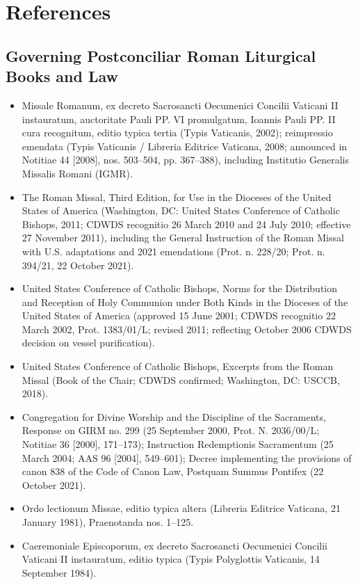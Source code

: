 \section*{References}
\subsection*{Governing Postconciliar Roman Liturgical Books and Law}
\begin{itemize}
\item Missale Romanum, ex decreto Sacrosancti Oecumenici Concilii Vaticani II instauratum, auctoritate Pauli PP. VI promulgatum, Ioannis Pauli PP. II cura recognitum, editio typica tertia (Typis Vaticanis, 2002); reimpressio emendata (Typis Vaticanis / Libreria Editrice Vaticana, 2008; announced in Notitiae 44 [2008], nos. 503--504, pp. 367--388), including Institutio Generalis Missalis Romani (IGMR).
\item The Roman Missal, Third Edition, for Use in the Dioceses of the United States of America (Washington, DC: United States Conference of Catholic Bishops, 2011; CDWDS recognitio 26 March 2010 and 24 July 2010; effective 27 November 2011), including the General Instruction of the Roman Missal with U.S. adaptations and 2021 emendations (Prot. n. 228/20; Prot. n. 394/21, 22 October 2021).
\item United States Conference of Catholic Bishops, Norms for the Distribution and Reception of Holy Communion under Both Kinds in the Dioceses of the United States of America (approved 15 June 2001; CDWDS recognitio 22 March 2002, Prot. 1383/01/L; revised 2011; reflecting October 2006 CDWDS decision on vessel purification).
\item United States Conference of Catholic Bishops, Excerpts from the Roman Missal (Book of the Chair; CDWDS confirmed; Washington, DC: USCCB, 2018).
\item Congregation for Divine Worship and the Discipline of the Sacraments, Response on GIRM no. 299 (25 September 2000, Prot. N. 2036/00/L; Notitiae 36 [2000], 171--173); Instruction Redemptionis Sacramentum (25 March 2004; AAS 96 [2004], 549--601); Decree implementing the provisions of canon 838 of the Code of Canon Law, Postquam Summus Pontifex (22 October 2021).
\item Ordo lectionum Missae, editio typica altera (Libreria Editrice Vaticana, 21 January 1981), Praenotanda nos. 1--125.
\item Caeremoniale Episcoporum, ex decreto Sacrosancti Oecumenici Concilii Vaticani II instauratum, editio typica (Typis Polyglottis Vaticanis, 14 September 1984).

\end{itemize}
